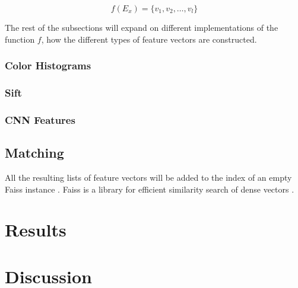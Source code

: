 \documentclass{article}
\begin{document}
\[f(E_x) = \{v_1, v_2, \dots, v_l\}\]

The rest of the subsections will expand on different implementations of the function $f$, how the different types of feature vectors are constructed.

\subsubsection{Color Histograms}
\subsubsection{Sift}
\subsubsection{CNN Features}

\subsection{Matching}

All the resulting lists of feature vectors will be added to the index of an empty Faiss instance \cite{faiss}. Faiss is a library for efficient similarity search of dense vectors .


\section{Results} \label{results}

\section{Discussion} \label{discussion}



\end{document}

